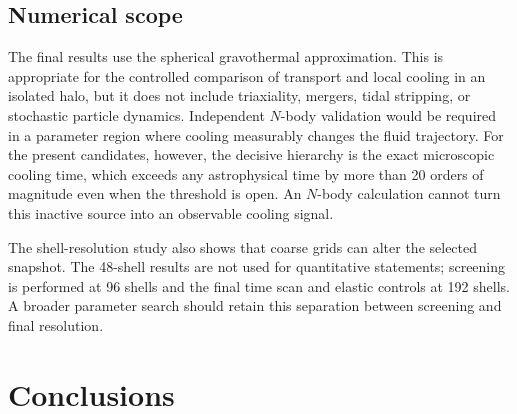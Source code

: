 \documentclass[12pt]{iopart}
\begin{document}
\subsection{Numerical scope}

The final results use the spherical gravothermal approximation.  This is
appropriate for the controlled comparison of transport and local cooling in
an isolated halo, but it does not include triaxiality, mergers, tidal stripping,
or stochastic particle dynamics.  Independent $N$-body validation would be
required in a parameter region where cooling measurably changes the fluid
trajectory.  For the present candidates, however, the decisive hierarchy is
the exact microscopic cooling time, which exceeds any astrophysical time by
more than 20 orders of magnitude even when the threshold is open.  An
$N$-body calculation cannot turn this inactive source into an observable
cooling signal.

The shell-resolution study also shows that coarse grids can alter the selected
snapshot.  The 48-shell results are not used for quantitative statements;
screening is performed at 96 shells and the final time scan and elastic
controls at 192 shells.  A broader parameter search should retain this
separation between screening and final resolution.

\section{Conclusions}
\label{sec:conclusions}
\end{document}
